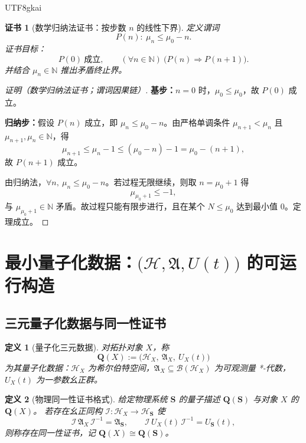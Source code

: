 \documentclass[12pt]{article}
\newtheorem{definition}{定义}[section]
\newtheorem{Certificate}{证书}[section]
\begin{document}
\begin{CJK*}{UTF8}{gkai}
\begin{Certificate}[数学归纳法证书：按步数 $n$ 的线性下界]
\label{cert:T4}
定义谓词
\[
P(n):\ \mu_n\le \mu_0-n.
\]
证书目标：
\[
P(0)\ \text{成立},\qquad (\forall n\in\mathbb N)\ \bigl(P(n)\Rightarrow P(n+1)\bigr).
\]
并结合 $\mu_n\in\mathbb N$ 推出矛盾终止界。
\end{Certificate}

\begin{proof}[证明（数学归纳法证书；谓词因果链）]
\textbf{基步：}$n=0$ 时，$\mu_0\le\mu_0$，故 $P(0)$ 成立。

\textbf{归纳步：}假设 $P(n)$ 成立，即 $\mu_n\le\mu_0-n$。由严格单调条件 $\mu_{n+1}<\mu_n$ 且 $\mu_{n+1},\mu_n\in\mathbb N$，得
\[
\mu_{n+1}\le\mu_n-1\le (\mu_0-n)-1=\mu_0-(n+1),
\]
故 $P(n+1)$ 成立。

由归纳法，$\forall n,\ \mu_n\le\mu_0-n$。若过程无限继续，则取 $n=\mu_0+1$ 得
\[
\mu_{\mu_0+1}\le -1,
\]
与 $\mu_{\mu_0+1}\in\mathbb N$ 矛盾。故过程只能有限步进行，且在某个 $N\le\mu_0$ 达到最小值 $0$。定理成立。
\end{proof}

\clearpage
\section{最小量子化数据：$\big(\mathcal H,\mathfrak A,U(t)\big)$ 的可运行构造}

\subsection{三元量子化数据与同一性证书}

\begin{definition}[量子化三元数据]
\label{def:D8}
对拓扑对象 $X$，称
\[
\mathbf Q(X):=\big(\mathcal H_X,\ \mathfrak A_X,\ U_X(t)\big)
\]
为其量子化数据：$\mathcal H_X$ 为希尔伯特空间，$\mathfrak A_X\subseteq\mathcal B(\mathcal H_X)$ 为可观测量 *-代数，$U_X(t)$ 为一参数幺正群。
\end{definition}

\begin{definition}[物理同一性证书格式]
\label{def:D9}
给定物理系统 $\mathbf S$ 的量子描述 $\mathbf Q(\mathbf S)$ 与对象 $X$ 的 $\mathbf Q(X)$。
若存在幺正同构 $\mathcal I:\mathcal H_X\to\mathcal H_{\mathbf S}$ 使
\[
\mathcal I\,\mathfrak A_X\,\mathcal I^{-1}=\mathfrak A_{\mathbf S},
\qquad
\mathcal I\,U_X(t)\,\mathcal I^{-1}=U_{\mathbf S}(t),
\]
则称存在同一性证书，记 $\mathbf Q(X)\cong \mathbf Q(\mathbf S)$。
\end{definition}


\end{CJK*}
\end{document}
